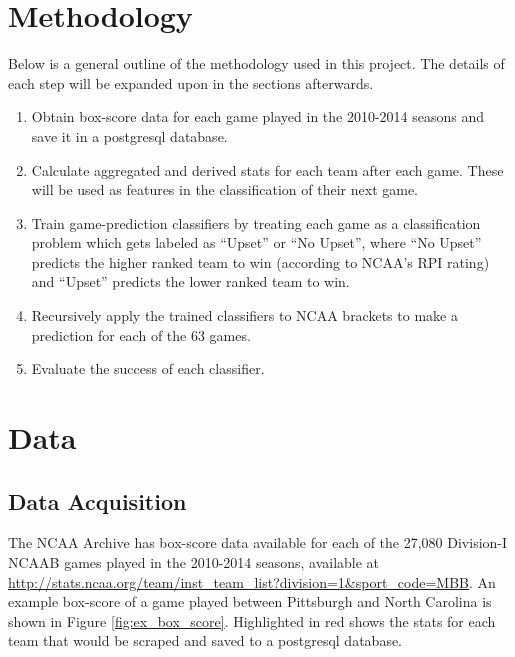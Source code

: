 \documentclass[]{article}
\begin{document}
\section{Methodology}
Below is a general outline of the methodology used in this project. The details of each step will be expanded upon in the sections afterwards.
\begin{enumerate}
	\item Obtain box-score data for each game played in the 2010-2014 seasons and save it in a postgresql database.

	\item Calculate aggregated and derived stats for each team after each game. These will be used as features in the classification of their next game.

	\item Train game-prediction classifiers by treating each game as a classification problem which gets labeled  as ``Upset'' or ``No Upset'', where ``No Upset'' predicts the higher ranked team to win (according to NCAA's RPI rating) and ``Upset'' predicts the lower ranked team to win.

	\item Recursively apply the trained classifiers to NCAA brackets to make a prediction for each of the 63 games.

	\item Evaluate the success of each classifier.
\end{enumerate}

\section{Data}
\subsection{Data Acquisition}
The NCAA Archive has box-score data available for each of the 27,080 Division-I NCAAB games played in the 2010-2014 seasons, available at \url{http://stats.ncaa.org/team/inst_team_list?division=1&sport_code=MBB}. An example box-score of a game played between Pittsburgh and North Carolina is shown in Figure \ref{fig:ex_box_score}. Highlighted in red shows the stats for each team that would be scraped and saved to a postgresql database.
\end{document}
